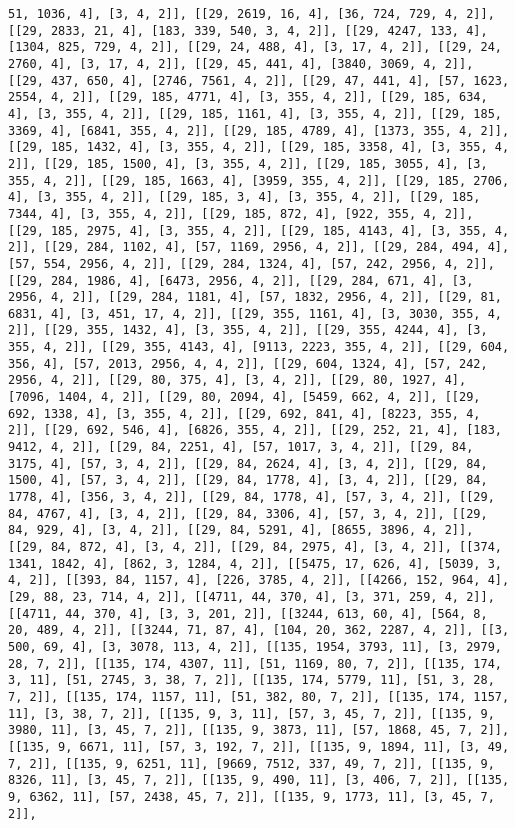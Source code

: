\documentclass[12pt,fleqn]{article}\usepackage{../../common}
\begin{document}
\begin{verbatim}
51, 1036, 4], [3, 4, 2]], [[29, 2619, 16, 4], [36, 724, 729, 4, 2]], [[29, 2833, 21, 4], [183, 339, 540, 3, 4, 2]], [[29, 4247, 133, 4], [1304, 825, 729, 4, 2]], [[29, 24, 488, 4], [3, 17, 4, 2]], [[29, 24, 2760, 4], [3, 17, 4, 2]], [[29, 45, 441, 4], [3840, 3069, 4, 2]], [[29, 437, 650, 4], [2746, 7561, 4, 2]], [[29, 47, 441, 4], [57, 1623, 2554, 4, 2]], [[29, 185, 4771, 4], [3, 355, 4, 2]], [[29, 185, 634, 4], [3, 355, 4, 2]], [[29, 185, 1161, 4], [3, 355, 4, 2]], [[29, 185, 3369, 4], [6841, 355, 4, 2]], [[29, 185, 4789, 4], [1373, 355, 4, 2]], [[29, 185, 1432, 4], [3, 355, 4, 2]], [[29, 185, 3358, 4], [3, 355, 4, 2]], [[29, 185, 1500, 4], [3, 355, 4, 2]], [[29, 185, 3055, 4], [3, 355, 4, 2]], [[29, 185, 1663, 4], [3959, 355, 4, 2]], [[29, 185, 2706, 4], [3, 355, 4, 2]], [[29, 185, 3, 4], [3, 355, 4, 2]], [[29, 185, 7344, 4], [3, 355, 4, 2]], [[29, 185, 872, 4], [922, 355, 4, 2]], [[29, 185, 2975, 4], [3, 355, 4, 2]], [[29, 185, 4143, 4], [3, 355, 4, 2]], [[29, 284, 1102, 4], [57, 1169, 2956, 4, 2]], [[29, 284, 494, 4], [57, 554, 2956, 4, 2]], [[29, 284, 1324, 4], [57, 242, 2956, 4, 2]], [[29, 284, 1986, 4], [6473, 2956, 4, 2]], [[29, 284, 671, 4], [3, 2956, 4, 2]], [[29, 284, 1181, 4], [57, 1832, 2956, 4, 2]], [[29, 81, 6831, 4], [3, 451, 17, 4, 2]], [[29, 355, 1161, 4], [3, 3030, 355, 4, 2]], [[29, 355, 1432, 4], [3, 355, 4, 2]], [[29, 355, 4244, 4], [3, 355, 4, 2]], [[29, 355, 4143, 4], [9113, 2223, 355, 4, 2]], [[29, 604, 356, 4], [57, 2013, 2956, 4, 4, 2]], [[29, 604, 1324, 4], [57, 242, 2956, 4, 2]], [[29, 80, 375, 4], [3, 4, 2]], [[29, 80, 1927, 4], [7096, 1404, 4, 2]], [[29, 80, 2094, 4], [5459, 662, 4, 2]], [[29, 692, 1338, 4], [3, 355, 4, 2]], [[29, 692, 841, 4], [8223, 355, 4, 2]], [[29, 692, 546, 4], [6826, 355, 4, 2]], [[29, 252, 21, 4], [183, 9412, 4, 2]], [[29, 84, 2251, 4], [57, 1017, 3, 4, 2]], [[29, 84, 3175, 4], [57, 3, 4, 2]], [[29, 84, 2624, 4], [3, 4, 2]], [[29, 84, 1500, 4], [57, 3, 4, 2]], [[29, 84, 1778, 4], [3, 4, 2]], [[29, 84, 1778, 4], [356, 3, 4, 2]], [[29, 84, 1778, 4], [57, 3, 4, 2]], [[29, 84, 4767, 4], [3, 4, 2]], [[29, 84, 3306, 4], [57, 3, 4, 2]], [[29, 84, 929, 4], [3, 4, 2]], [[29, 84, 5291, 4], [8655, 3896, 4, 2]], [[29, 84, 872, 4], [3, 4, 2]], [[29, 84, 2975, 4], [3, 4, 2]], [[374, 1341, 1842, 4], [862, 3, 1284, 4, 2]], [[5475, 17, 626, 4], [5039, 3, 4, 2]], [[393, 84, 1157, 4], [226, 3785, 4, 2]], [[4266, 152, 964, 4], [29, 88, 23, 714, 4, 2]], [[4711, 44, 370, 4], [3, 371, 259, 4, 2]], [[4711, 44, 370, 4], [3, 3, 201, 2]], [[3244, 613, 60, 4], [564, 8, 20, 489, 4, 2]], [[3244, 71, 87, 4], [104, 20, 362, 2287, 4, 2]], [[3, 500, 69, 4], [3, 3078, 113, 4, 2]], [[135, 1954, 3793, 11], [3, 2979, 28, 7, 2]], [[135, 174, 4307, 11], [51, 1169, 80, 7, 2]], [[135, 174, 3, 11], [51, 2745, 3, 38, 7, 2]], [[135, 174, 5779, 11], [51, 3, 28, 7, 2]], [[135, 174, 1157, 11], [51, 382, 80, 7, 2]], [[135, 174, 1157, 11], [3, 38, 7, 2]], [[135, 9, 3, 11], [57, 3, 45, 7, 2]], [[135, 9, 3980, 11], [3, 45, 7, 2]], [[135, 9, 3873, 11], [57, 1868, 45, 7, 2]], [[135, 9, 6671, 11], [57, 3, 192, 7, 2]], [[135, 9, 1894, 11], [3, 49, 7, 2]], [[135, 9, 6251, 11], [9669, 7512, 337, 49, 7, 2]], [[135, 9, 8326, 11], [3, 45, 7, 2]], [[135, 9, 490, 11], [3, 406, 7, 2]], [[135, 9, 6362, 11], [57, 2438, 45, 7, 2]], [[135, 9, 1773, 11], [3, 45, 7, 2]], 
\end{verbatim}
\end{document}
